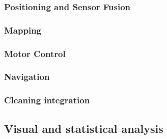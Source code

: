 \subsubsection{Positioning and Sensor Fusion}
\label{sec:position}

\subsubsection{Mapping}
\label{sec:mapping}

\subsubsection{Motor Control}
\label{sec:control}

\subsubsection{Navigation}
\label{sec:navigation}



\subsubsection{Cleaning integration}
\label{sec:cleaning}

\subsection{Visual and statistical analysis}
\label{sec:stats}

\newpage


